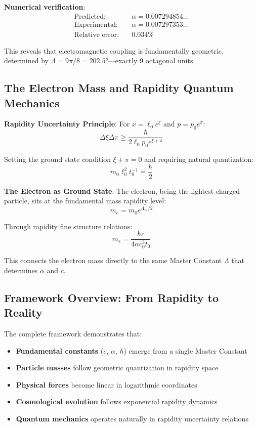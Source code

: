 \documentclass[12pt,a4paper]{article}
\begin{document}
\textbf{Numerical verification}:
\begin{align}
\text{Predicted:} \quad &\alpha = 0.007294854... \\
\text{Experimental:} \quad &\alpha = 0.007297353... \\
\text{Relative error:} \quad &0.034\%
\end{align}

This reveals that electromagnetic coupling is fundamentally geometric, determined by $\Lambda = 9\pi/8 = 202.5°$—exactly 9 octagonal units.

\subsection{The Electron Mass and Rapidity Quantum Mechanics}

\textbf{Rapidity Uncertainty Principle}: For $x = \ell_0 e^{\xi}$ and $p = p_0 e^{\pi}$:
\begin{equation}
\Delta\xi \Delta\pi \geq \frac{\hbar}{2\ell_0 p_0 e^{\xi + \pi}}
\end{equation}

Setting the ground state condition $\xi + \pi = 0$ and requiring natural quantization:
\begin{equation}
m_0 \ell_0^2 t_0^{-1} = \frac{\hbar}{2}
\end{equation}

\textbf{The Electron as Ground State}: The electron, being the lightest charged particle, sits at the fundamental mass rapidity level:
\begin{equation}
m_e = m_0 e^{\Lambda_m/2}
\end{equation}

Through rapidity fine structure relations:
\begin{equation}
m_e = \frac{\hbar c}{4\alpha c_0^3 t_0}
\end{equation}

This connects the electron mass directly to the same Master Constant $\Lambda$ that determines $\alpha$ and $c$.

\subsection{Framework Overview: From Rapidity to Reality}

The complete framework demonstrates that:
\begin{itemize}
\item \textbf{Fundamental constants} ($c$, $\alpha$, $\hbar$) emerge from a single Master Constant
\item \textbf{Particle masses} follow geometric quantization in rapidity space
\item \textbf{Physical forces} become linear in logarithmic coordinates
\item \textbf{Cosmological evolution} follows exponential rapidity dynamics
\item \textbf{Quantum mechanics} operates naturally in rapidity uncertainty relations
\end{itemize}
\end{document}
